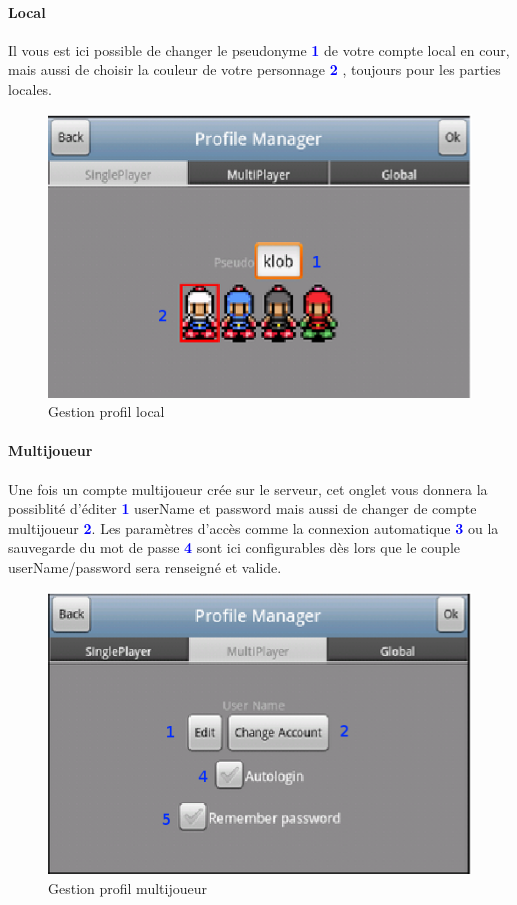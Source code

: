 		\paragraph{Local\\}
		Il vous est ici possible de changer le pseudonyme \textcolor{blue}{\textbf{1}}
		de votre compte local en cour, mais aussi de choisir la couleur de votre
		personnage \textcolor{blue}{\textbf{2}} , toujours pour les parties locales.
		\begin{figure}[H]
			\centering
				\includegraphics[scale=0.7]{Manuel/Img/5}
				\caption{Gestion profil local}
			\end{figure}
		
		\paragraph{Multijoueur\\}
		Une fois un compte multijoueur crée sur le serveur, cet onglet vous donnera la
		possiblité d'éditer \textcolor{blue}{\textbf{1}} userName et password mais
		aussi de changer de compte multijoueur \textcolor{blue}{\textbf{2}}. Les
		paramètres d'accès comme la connexion automatique
		\textcolor{blue}{\textbf{3}} ou la sauvegarde du mot de passe
		\textcolor{blue}{\textbf{4}} sont ici configurables dès lors que le couple
		userName/password sera renseigné et valide.
		
		\begin{figure}[H]
			\centering
				\includegraphics[scale=0.7]{Manuel/Img/6}
				\caption{Gestion profil multijoueur}
			\end{figure}
		

